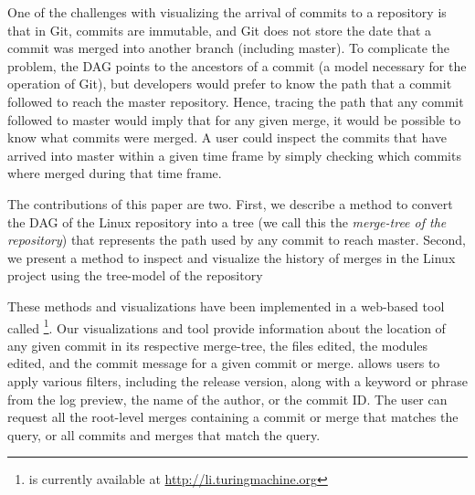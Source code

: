 \documentclass[conference, draftclsnofoot, draft]{IEEEtran}
\begin{document}
One of the challenges with visualizing the arrival of commits to a repository is that
in Git, commits are immutable, and Git does not store the date that a commit was merged into another branch (including master).
To complicate the problem, the DAG points to the ancestors of a commit (a model necessary for the operation of Git), but developers 
would prefer to know the path that a commit followed to reach the master repository.
Hence, tracing the path that any commit followed to master would imply that for any given merge, it would be possible to know what commits were merged. A user could
inspect the commits that have arrived into master within a given time frame by simply checking which commits where merged during that time frame.



 The contributions of this paper are two. First, we describe a method to convert the DAG of the Linux repository into a tree (we call this the \emph{merge-tree of the
 repository}) that represents the path used by
 any commit to reach master. Second, 
 we present a method to inspect and visualize the history of merges in the  Linux project using the tree-model of the repository
 
These methods and visualizations have been implemented in a web-based
tool called \tool\footnote{\tool is currently available at \url{http://li.turingmachine.org}}. Our visualizations and tool provide information about the location of any given
commit in its respective merge-tree, the files edited, the modules edited, and the
commit message for a given commit or merge. \tool allows users to apply various
filters, including the release version, along with a keyword or phrase from the log
preview, the name of the author, or the commit ID. The user can request all the
root-level merges containing a commit or merge that matches the query, or all
commits and merges that match the query.
\end{document}
